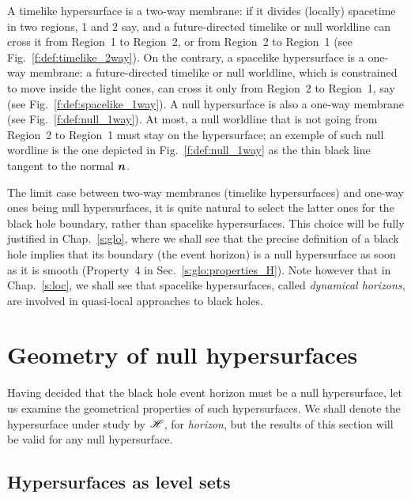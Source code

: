 A timelike hypersurface is a two-way membrane: if it divides (locally)
spacetime in two regions, 1 and 2 say, and a future-directed timelike or null
worldline can cross it from Region~1 to Region~2, or from Region~2 to Region~1
(see Fig.~\ref{f:def:timelike_2way}). On the contrary,
a spacelike hypersurface is a one-way membrane: a future-directed timelike or null
worldline, which is constrained to move inside the light cones,
can cross it only from Region~2 to Region~1, say (see Fig.~\ref{f:def:spacelike_1way}).
A null hypersurface is also a one-way membrane (see Fig.~\ref{f:def:null_1way}).
At most, a null worldline that is not going from Region~2 to Region~1 must
stay on the hypersurface; an exemple of such null wordline is
the one depicted in Fig.~\ref{f:def:null_1way} as the thin black line tangent to the normal $\bm{n}$.

The limit case between two-way membranes (timelike hypersurfaces)
and one-way ones being null hypersurfaces, it is quite natural to select the
latter ones for the black hole boundary, rather than spacelike hypersurfaces.
This choice will be fully justified in Chap.~\ref{s:glo}, where we shall see
that the precise definition of a black hole implies that its boundary
(the event horizon)
is a null hypersurface as soon as it is smooth (Property~4 in Sec.~\ref{s:glo:properties_H}).
Note however that in Chap.~\ref{s:loc}, we shall see that spacelike hypersurfaces,
called \emph{dynamical
horizons}, are involved
in quasi-local approaches to black holes.


\section{Geometry of null hypersurfaces} \label{s:def:geom_null_hypsurf}

Having decided that the black hole event horizon must be a null hypersurface,
let us examine the geometrical properties of such hypersurfaces. We shall
denote the hypersurface under study by $\mathscr{H}$, for \emph{horizon}, but the results of this section
will be valid for any null hypersurface.

\subsection{Hypersurfaces as level sets}

